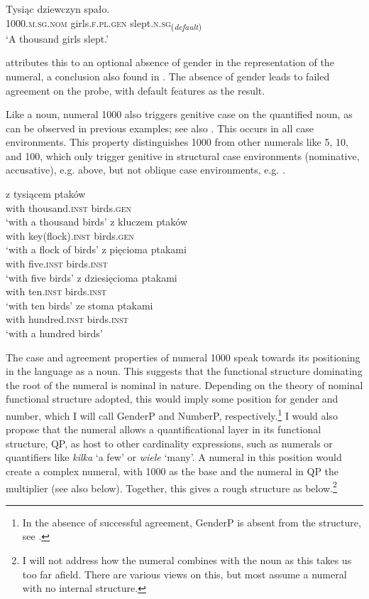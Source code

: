 \documentclass[output=paper]{langscibook}
\begin{document}
\ea\label{klo:ex:defagr1000}
\gll Tysiąc dziewczyn spało.\\
1000.\textsc{m.sg.nom} girls.\textsc{f.pl.gen} slept.\textsc{n.sg}\textsubscript{(\textit{default})}\\
\glt `A thousand girls slept.'
\z

\noindent \citet{klockmann2017semiLex} attributes this to an optional absence of gender in the representation of the numeral, a conclusion also found in \citet{ionin_matushansky2018cardinals}. The absence of gender leads to failed agreement on the probe, with default features as the result.

Like a noun, numeral 1000 also triggers genitive case on the quantified noun, as can be observed in previous examples; see also . This occurs in all case environments. This property distinguishes 1000 from other numerals like 5, 10, and 100, which only trigger genitive in structural case environments (nominative, accusative), e.g.  above, but not oblique case environments, e.g. .

\ea \label{klo:ex:non-structuralCase}
\ea 
\gll z tysiącem ptaków\\
with thousand.\textsc{inst} birds.\textsc{gen}\\
\glt `with a thousand birds'
\ex  \gll z kluczem ptaków\\
with key(flock).\textsc{inst} birds.\textsc{gen}\\
\glt `with a flock of birds'
\z \ex \label{klo:ex:5+obl}
\ea \gll z pięcioma ptakami\\
with five.\textsc{inst} birds.\textsc{inst}\\
\glt `with five birds'
\ex  \gll z dziesięcioma ptakami\\
with ten.\textsc{inst} birds.\textsc{inst}\\
\glt `with ten birds'
\ex  \gll ze stoma ptakami\\
with hundred.\textsc{inst} birds.\textsc{inst}\\
\glt `with a hundred birds'
\z \z %

\noindent The case and agreement properties of numeral 1000 speak towards its positioning in the language as a noun. This suggests that the functional structure dominating the root of the numeral is nominal in nature. Depending on the theory of nominal functional structure adopted, this would imply some position for gender and number, which I will call GenderP and NumberP, respectively.\footnote{In the absence of successful agreement, GenderP is absent from the structure, see .} I would also propose that the numeral allows a quantificational layer in its functional structure, QP, as host to other cardinality expressions, such as numerals or quantifiers like \textit{kilka} `a few' or \textit{wiele} `many'. A numeral in this position would create a complex numeral, with 1000 as the base and the numeral in QP the multiplier (see also  below). Together, this gives a rough structure as below.\footnote{I will not address how the numeral combines with the noun as this takes us too far afield. There are various views on this, but most assume a numeral with no internal structure.}
\end{document}
